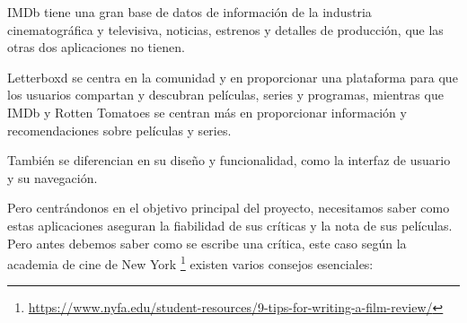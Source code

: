 IMDb tiene una gran base de datos de información de la industria cinematográfica y televisiva, 
noticias, estrenos y detalles de producción, que las otras dos aplicaciones no tienen.

Letterboxd se centra en la comunidad y en proporcionar una plataforma para que los usuarios compartan 
y descubran películas, series y programas, mientras que IMDb y Rotten Tomatoes se centran más en 
proporcionar información y recomendaciones sobre películas y series.

También se diferencian en su diseño y funcionalidad, como la interfaz de usuario y su navegación.

Pero centrándonos en el objetivo principal del proyecto, necesitamos saber como estas aplicaciones aseguran la fiabilidad de sus críticas y la nota de sus películas. Pero antes debemos saber como se escribe una crítica, este caso según la academia de cine de New York \footnote{\url{https://www.nyfa.edu/student-resources/9-tips-for-writing-a-film-review/}} existen varios consejos esenciales:

